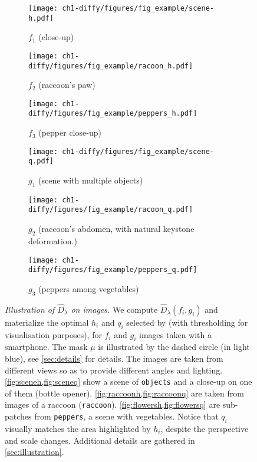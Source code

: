 \begin{figure*}[ht]
\centering
    \begin{subfigure}{0.25\textwidth}
\texttt{[image: ch1-diffy/figures/fig\_example/scene-h.pdf]}
\caption{$f_1$ (close-up)}
\label{fig:sceneh}
    \end{subfigure}\hfil
    \begin{subfigure}{0.25\textwidth}
\texttt{[image: ch1-diffy/figures/fig\_example/racoon\_h.pdf]}
\caption{$f_2$ (raccoon's paw)}
\label{fig:raccoonh}    \end{subfigure}\hfil
     \begin{subfigure}{0.25\textwidth}
\texttt{[image: ch1-diffy/figures/fig\_example/peppers\_h.pdf]}
\caption{$f_3$ (pepper close-up)}
\label{fig:flowersh}
    \end{subfigure}
\smallskip
     \begin{subfigure}{0.25\textwidth}
\texttt{[image: ch1-diffy/figures/fig\_example/scene-q.pdf]}
\caption{$g_1$ (scene with multiple objects)}
\label{fig:sceneq}
    \end{subfigure}\hfil
     \begin{subfigure}{0.25\textwidth}
\texttt{[image: ch1-diffy/figures/fig\_example/racoon\_q.pdf]}
\caption{$g_2$ (raccoon's abdomen, with natural keystone deformation.)}
\label{fig:raccoonq}
    \end{subfigure}\hfil
     \begin{subfigure}{0.25\textwidth}
\texttt{[image: ch1-diffy/figures/fig\_example/peppers\_q.pdf]}
\caption{$g_3$ (peppers among vegetables)}
\label{fig:flowersq}
    \end{subfigure}
\caption[Illustration of Diffy on images.]{\emph{Illustration of $\widehat D_\lambda$ on images.} We compute $\widehat D_\lambda(f_i, g_i)$ and materialize the optimal $h_i$ and $q_i$ selected by \Diffy (with thresholding for visualisation purposes), for $f_i$ and $g_i$ images taken with a smartphone. The mask $\mu$ is illustrated by the dashed circle (in light blue), see \cref{sec:details} for details. The images are taken from different views so as to provide different angles and lighting. \cref{fig:sceneh,fig:sceneq} show a scene of \texttt{objects} and a close-up on one of them (bottle opener). \cref{fig:raccoonh,fig:raccoonq} are taken from images of a raccoon (\texttt{raccoon}). \cref{fig:flowersh,fig:flowersq} are sub-patches from \texttt{peppers}, a scene with vegetables. Notice that $q_i$ visually matches the area highlighted by $h_i$, despite the perspective and scale changes. Additional details are gathered in \cref{sec:illustration}.}
\label{fig:example}
    \end{figure*}

